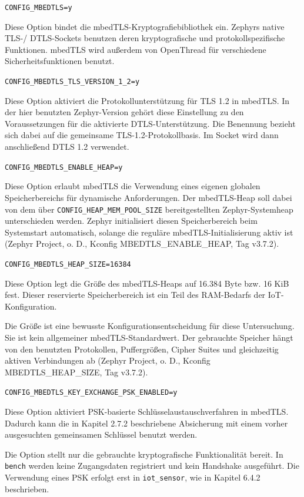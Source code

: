 \lstinline[style=fileinline]|CONFIG_MBEDTLS=y|

Diese Option bindet die mbedTLS-Kryptografiebibliothek ein. Zephyrs native TLS-/ DTLS-Sockets benutzen deren kryptografische und protokollspezifische Funktionen. mbedTLS wird außerdem von OpenThread für verschiedene Sicherheitsfunktionen benutzt.

\lstinline[style=fileinline]|CONFIG_MBEDTLS_TLS_VERSION_1_2=y|

Diese Option aktiviert die Protokollunterstützung für TLS 1.2 in mbedTLS. In der hier benutzten Zephyr-Version gehört diese Einstellung zu den Voraussetzungen für die aktivierte DTLS-Unterstützung. Die Benennung bezieht sich dabei auf die gemeinsame TLS-1.2-Protokollbasis. Im Socket wird dann anschließend DTLS 1.2 verwendet.

\lstinline[style=fileinline]|CONFIG_MBEDTLS_ENABLE_HEAP=y|

Diese Option erlaubt mbedTLS die Verwendung eines eigenen globalen Speicherbereichs für dynamische Anforderungen. Der mbedTLS-Heap soll dabei von dem über \lstinline[style=fileinline]|CONFIG_HEAP_MEM_POOL_SIZE| bereitgestellten Zephyr-Systemheap unterschieden werden. Zephyr initialisiert diesen Speicherbereich beim Systemstart automatisch, solange die reguläre mbedTLS-Initialisierung aktiv ist (Zephyr Project, o. D., Kconfig MBEDTLS\_ENABLE\_HEAP, Tag v3.7.2).

\lstinline[style=fileinline]|CONFIG_MBEDTLS_HEAP_SIZE=16384|

Diese Option legt die Größe des mbedTLS-Heaps auf 16.384 Byte bzw. 16 KiB fest. Dieser reservierte Speicherbereich ist ein Teil des RAM-Bedarfs der IoT-Konfiguration.

Die Größe ist eine bewusste Konfigurationsentscheidung für diese Untersuchung. Sie ist kein allgemeiner mbedTLS-Standardwert. Der gebrauchte Speicher hängt von den benutzten Protokollen, Puffergrößen, Cipher Suites und gleichzeitig aktiven Verbindungen ab (Zephyr Project, o. D., Kconfig MBEDTLS\_HEAP\_SIZE, Tag v3.7.2).

\lstinline[style=fileinline]|CONFIG_MBEDTLS_KEY_EXCHANGE_PSK_ENABLED=y|

Diese Option aktiviert PSK-basierte Schlüsselaustauschverfahren in mbedTLS. Dadurch kann die in Kapitel 2.7.2 beschriebene Absicherung mit einem vorher ausgesuchten gemeinsamen Schlüssel benutzt werden.

Die Option stellt nur die gebrauchte kryptografische Funktionalität bereit. In \lstinline[style=fileinline]|bench| werden keine Zugangsdaten registriert und kein Handshake ausgeführt. Die Verwendung eines PSK erfolgt erst in \lstinline[style=fileinline]|iot_sensor|, wie in Kapitel 6.4.2 beschrieben.

